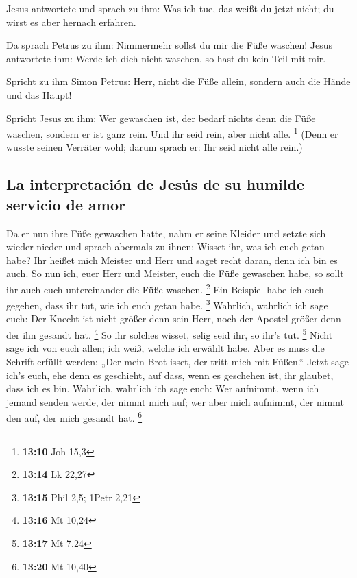  Jesus antwortete und sprach zu ihm: Was ich tue, das
weißt du jetzt nicht; du wirst es aber hernach erfahren.

 Da sprach Petrus zu ihm: Nimmermehr sollst du mir die
Füße waschen! Jesus antwortete ihm: Werde ich dich nicht waschen, so
hast du kein Teil mit mir.

 Spricht zu ihm Simon Petrus: Herr, nicht die Füße allein,
sondern auch die Hände und das Haupt!

 Spricht Jesus zu ihm: Wer gewaschen ist, der bedarf
nichts denn die Füße waschen, sondern er ist ganz rein. Und ihr seid
rein, aber nicht alle. \footnote{\textbf{13:10} Joh 15,3}
 (Denn er wusste seinen Verräter wohl; darum sprach er:
Ihr seid nicht alle rein.)

\hypertarget{la-interpretaciuxf3n-de-jesuxfas-de-su-humilde-servicio-de-amor}{%
\subsection{La interpretación de Jesús de su humilde servicio de
amor}\label{la-interpretaciuxf3n-de-jesuxfas-de-su-humilde-servicio-de-amor}}

 Da er nun ihre Füße gewaschen hatte, nahm er seine
Kleider und setzte sich wieder nieder und sprach abermals zu ihnen:
Wisset ihr, was ich euch getan habe?  Ihr heißet mich
Meister und Herr und saget recht daran, denn ich bin es auch.
 So nun ich, euer Herr und Meister, euch die Füße
gewaschen habe, so sollt ihr auch euch untereinander die Füße waschen.
\footnote{\textbf{13:14} Lk 22,27}  Ein Beispiel habe ich
euch gegeben, dass ihr tut, wie ich euch getan habe. \footnote{\textbf{13:15}
  Phil 2,5; 1Petr 2,21}  Wahrlich, wahrlich ich sage
euch: Der Knecht ist nicht größer denn sein Herr, noch der Apostel
größer denn der ihn gesandt hat. \footnote{\textbf{13:16} Mt 10,24}
 So ihr solches wisset, selig seid ihr, so ihr's tut.
\footnote{\textbf{13:17} Mt 7,24}  Nicht sage ich von
euch allen; ich weiß, welche ich erwählt habe. Aber es muss die Schrift
erfüllt werden: „Der mein Brot isset, der tritt mich mit Füßen.``
 Jetzt sage ich's euch, ehe denn es geschieht, auf dass,
wenn es geschehen ist, ihr glaubet, dass ich es bin. 
Wahrlich, wahrlich ich sage euch: Wer aufnimmt, wenn ich jemand senden
werde, der nimmt mich auf; wer aber mich aufnimmt, der nimmt den auf,
der mich gesandt hat. \footnote{\textbf{13:20} Mt 10,40}

